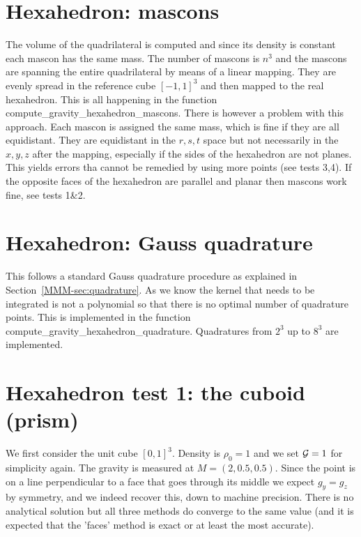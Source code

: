 \section*{Hexahedron: mascons}

The volume of the quadrilateral is computed and since its density is 
constant each mascon has the same mass. 
The number of mascons is $n^3$ and the mascons are spanning the entire 
quadrilateral by means of a linear mapping. They are evenly spread in the 
reference cube $[-1,1]^3$ and then mapped to the real hexahedron.
This is all happening in the function {\python compute\_gravity\_hexahedron\_mascons}.
There is however a problem with this approach. Each mascon is assigned the same mass, 
which is fine if they are all equidistant. They are equidistant in the $r,s,t$ space
but not necessarily in the $x,y,z$ after the mapping, especially if the sides of the 
hexahedron are not planes. This yields errors tha cannot be remedied by using 
more points (see tests 3,4). If the opposite faces of the hexahedron are  
parallel and planar then mascons work fine, see tests 1\&2.

\section*{Hexahedron: Gauss quadrature}

This follows a standard Gauss quadrature procedure as explained
in Section~\ref{MMM-sec:quadrature}. As we know the 
kernel that needs to be integrated is not a polynomial so that 
there is no optimal number of quadrature points. 
This is implemented in the function {\python compute\_gravity\_hexahedron\_quadrature}.
Quadratures from $2^3$ up to $8^3$ are implemented.

\section*{Hexahedron test 1: the cuboid (prism)}

We first consider the unit cube $[0,1]^3$. Density is $\rho_0=1$ and 
we set ${\cal G}=1$ for simplicity again.
The gravity is measured at $M=(2,0.5,0.5)$. Since the point is on a line perpendicular 
to a face that goes through its middle we expect $g_y=g_z$ by symmetry, and 
we indeed recover this, down to machine precision.
There is no analytical solution but all three methods do converge to the same value
(and it is expected that the 'faces' method is exact or at least the most accurate).

